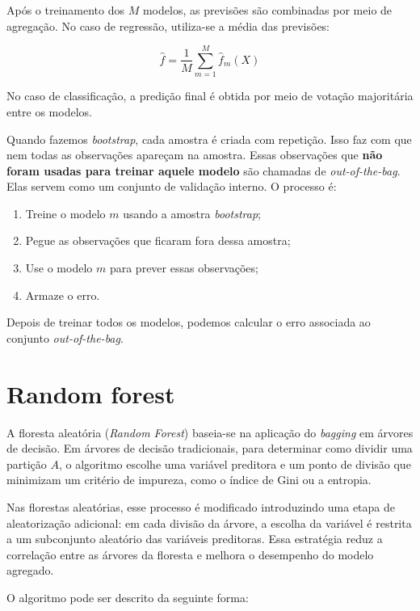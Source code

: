\documentclass{article}
\begin{document}
Após o treinamento dos $M$ modelos, as previsões são combinadas
por meio de agregação. No caso de regressão, utiliza-se a média
das previsões:

\begin{equation}
    \hat{f} = \frac{1}{M}\sum_{m = 1}^{M}\hat{f}_{m}(X)
\end{equation}

No caso de classificação, a predição final é obtida por meio
de votação majoritária entre os modelos.

Quando fazemos \textit{bootstrap}, cada amostra é criada com 
repetição. Isso faz com que nem todas as observações apareçam 
na amostra. Essas observações que \textbf{não foram usadas para treinar aquele modelo}
são chamadas de \textit{out-of-the-bag}. Elas servem como um 
conjunto de validação interno. O processo é:

\begin{enumerate}
    \item Treine o modelo $m$ usando a amostra \textit{bootstrap};
    \item Pegue as observações que ficaram fora dessa amostra;
    \item Use o modelo $m$ para prever essas observações;
    \item Armaze o erro.
\end{enumerate}

Depois de treinar todos os modelos, podemos calcular o erro 
associada ao conjunto \textit{out-of-the-bag}.

\section{Random forest}

A floresta aleatória (\textit{Random Forest}) baseia-se na aplicação do 
\textit{bagging} em árvores de decisão. Em árvores de decisão tradicionais, 
para determinar como dividir uma partição $A$, o algoritmo escolhe uma 
variável preditora e um ponto de divisão que minimizam um critério de 
impureza, como o índice de Gini ou a entropia.


Nas florestas aleatórias, esse processo é modificado introduzindo uma etapa
de aleatorização adicional: em cada divisão da árvore, a escolha da variável
é restrita a um subconjunto aleatório das variáveis preditoras. Essa estratégia
reduz a correlação entre as árvores da floresta e melhora o desempenho do 
modelo agregado.

O algoritmo pode ser descrito da seguinte forma:
\end{document}
